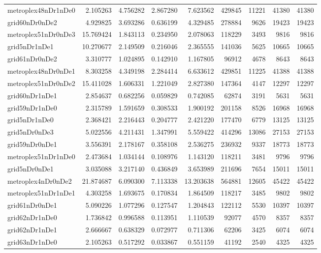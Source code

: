 \begin{longtable}{|l|r|r|r|r|r|r|r|r|}
metroplex48nDr1nDe0 & 2.105263 & 4.756282 & 2.867280 & 7.623562 & 429845 & 11221 & 41380 & 41380 \\
grid60nDr0nDe2 & 4.929825 & 3.693286 & 0.636199 & 4.329485 & 278884 & 9626 & 19423 & 19423 \\
metroplex51nDr0nDe3 & 15.769424 & 1.843113 & 0.234950 & 2.078063 & 118229 & 3493 & 9816 & 9816 \\
grid5nDr1nDe1 & 10.270677 & 2.149509 & 0.216046 & 2.365555 & 141036 & 5625 & 10665 & 10665 \\
grid61nDr0nDe2 & 3.310777 & 1.024895 & 0.142910 & 1.167805 & 96912 & 4678 & 8643 & 8643 \\
metroplex48nDr0nDe1 & 8.303258 & 4.349198 & 2.284414 & 6.633612 & 429851 & 11225 & 41388 & 41388 \\
metroplex51nDr0nDe2 & 15.411028 & 1.606331 & 1.221049 & 2.827380 & 147364 & 4147 & 12297 & 12297 \\
grid60nDr1nDe1 & 2.854637 & 0.682256 & 0.059829 & 0.742085 & 62874 & 3191 & 5631 & 5631 \\
grid59nDr1nDe0 & 2.315789 & 1.591659 & 0.308533 & 1.900192 & 201158 & 8526 & 16968 & 16968 \\
grid5nDr1nDe0 & 2.368421 & 2.216443 & 0.204777 & 2.421220 & 177470 & 6779 & 13125 & 13125 \\
grid5nDr0nDe3 & 5.022556 & 4.211431 & 1.347991 & 5.559422 & 414296 & 13086 & 27153 & 27153 \\
grid59nDr0nDe1 & 3.556391 & 2.178167 & 0.358108 & 2.536275 & 236932 & 9337 & 18773 & 18773 \\
metroplex51nDr1nDe0 & 2.473684 & 1.034144 & 0.108976 & 1.143120 & 118211 & 3481 & 9796 & 9796 \\
grid5nDr0nDe1 & 3.035088 & 3.217140 & 0.436849 & 3.653989 & 211696 & 7654 & 15011 & 15011 \\
metroplex4nDr0nDe2 & 21.874687 & 6.090300 & 7.113338 & 13.203638 & 564881 & 12605 & 45422 & 45422 \\
metroplex51nDr1nDe1 & 4.303258 & 1.693675 & 0.170834 & 1.864509 & 118217 & 3485 & 9802 & 9802 \\
grid61nDr0nDe1 & 5.090226 & 1.077296 & 0.127547 & 1.204843 & 122112 & 5530 & 10397 & 10397 \\
grid62nDr1nDe0 & 1.736842 & 0.996588 & 0.113951 & 1.110539 & 92077 & 4570 & 8357 & 8357 \\
grid62nDr1nDe1 & 2.666667 & 0.638329 & 0.072977 & 0.711306 & 62206 & 3425 & 6074 & 6074 \\
grid63nDr1nDe0 & 2.105263 & 0.517292 & 0.033867 & 0.551159 & 41192 & 2540 & 4325 & 4325 \\

\end{longtable}
